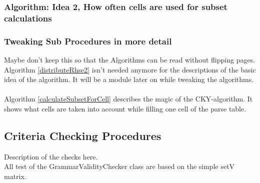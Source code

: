 \pagebreak

\subsubsection{Algorithm: Idea 2, How often cells are used for subset calculations}

\pagebreak

\subsubsection{Tweaking Sub Procedures in more detail}
Maybe don't keep this so that the Algorithms can be read without flipping pages.\\

\noindent
{}
Algorithm \ref{distributeRhse2} isn't needed anymore for the descriptions of the basic idea of the algorithm. It will be a module later on while tweaking the algorithms.
\\
\\
Algorithm \ref{calculateSubsetForCell} describes the magic of the CKY-algorithm. It shows what cells are taken into account while filling one cell of the parse table.

\pagebreak

\subsection{Criteria Checking Procedures}
\noindent Description of the checks here. \\
\noindent All test of the GrammarValidityChecker class are based on the simple setV matrix. \\

